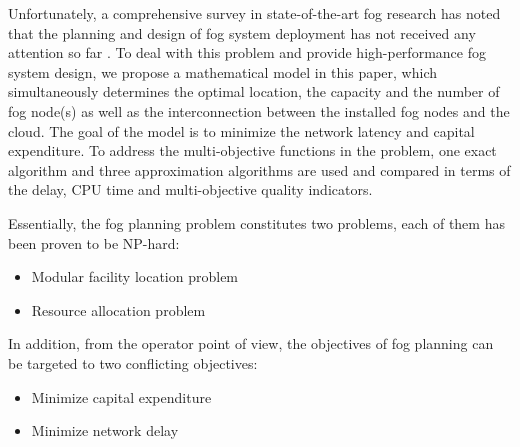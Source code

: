 \documentclass[10pt,journal,compsoc]{IEEEtran}
\begin{document}
Unfortunately, a comprehensive survey in state-of-the-art fog research has noted that the planning and design of fog system deployment has not received any attention so far \cite{mouradian2017comprehensive}. To deal with this problem and provide high-performance fog system design, we propose a mathematical model in this paper, which simultaneously determines the optimal location, the capacity and the number of fog node(s) as well as the interconnection between the installed fog nodes and the cloud. The goal of the model is to minimize the network latency and capital expenditure. To address the multi-objective functions in the problem, one exact algorithm and three approximation algorithms are used and compared in terms of the delay, CPU time and multi-objective quality indicators. 


Essentially, the fog planning problem constitutes two problems, each of them has been proven to be NP-hard:
\begin{itemize}
\item Modular facility location problem
\item Resource allocation problem
\end{itemize}
In addition, from the operator point of view, the objectives of fog planning can be targeted to two conflicting objectives:
\begin{itemize}
\item Minimize capital expenditure
\item Minimize network delay
\end{itemize}
\end{document}

